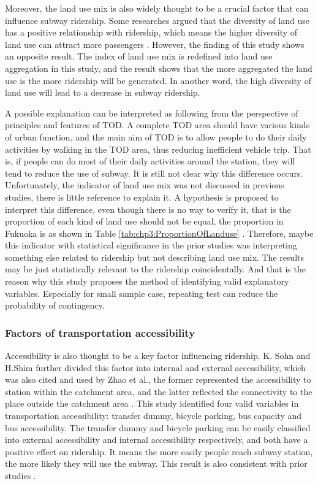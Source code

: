 %
Moreover, the land use mix is also widely thought to be a crucial factor that can influence subway ridership. Some researches argued that the diversity of land use has a positive relationship with ridership, which means the higher diversity of land use can attract more passengers \cite{gutierrez2011transit,jun2015land}. However, the finding of this study shows an opposite result. The index of land use mix is redefined into land use aggregation in this study, and the result shows that the more aggregated the land use is the more ridership will be generated. In another word, the high diversity of land use will lead to a decrease in subway ridership. 

%
A possible explanation can be interpreted as following from the perspective of principles and features of TOD. A complete TOD area should have various kinds of urban function, and the main aim of TOD is to allow people to do their daily activities by walking in the TOD area, thus reducing inefficient vehicle trip. That is, if people can do most of their daily activities around the station, they will tend to reduce the use of subway. It is still not clear why this difference occurs. Unfortunately, the indicator of land use mix was not discussed in previous studies, there is little reference to explain it. A hypothesis is proposed to interpret this difference, even though there is no way to verify it, that is the proportion of each kind of land use should not be equal, the proportion in Fukuoka is as shown in Table \ref{tab:chp3:ProportionOfLanduse} \cite{bhat2007comprehensive}. Therefore, maybe this indicator with statistical significance in the prior studies was interpreting something else related to ridership but not describing land use mix. The results may be just statistically relevant to the ridership coincidentally. And that is the reason why this study proposes the method of identifying valid explanatory variables. Especially for small sample case, repeating test can reduce the probability of contingency.

%
\subsubsection{Factors of transportation accessibility}
%
Accessibility is also thought to be a key factor influencing ridership. K. Sohn and H.Shim further divided this factor into internal and external accessibility, which was also cited and used by Zhao et al., the former represented the accessibility to station within the catchment area, and the latter reflected the connectivity to the place outside the catchment area \cite{sohn2010factors,zhao2013influences}. This study identified four valid variables in transportation accessibility: transfer dummy, bicycle parking, bus capacity and bus accessibility. The transfer dummy and bicycle parking can be easily classified into external accessibility and internal accessibility respectively, and both have a positive effect on ridership. It means the more easily people reach subway station, the more likely they will use the subway. This result is also consistent with prior studies \cite{gutierrez2011transit,cardozo2012application,kuby2004factors}.

